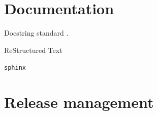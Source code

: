 \section{\label{sec:doc}Documentation}

Docstring standard \cite{SciPyProceedings_27}.

ReStructured Text

\texttt{sphinx}

\section{\label{sec:release}Release management}

